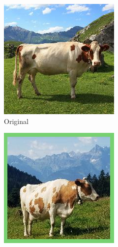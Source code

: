 \begin{figure}
    \centering
    \begin{subfigure}[b]{0.22\textwidth}
        \centering
        \includegraphics[width=\textwidth]{img/introduction/cow_original.jpg}
        \caption{Original}
    \end{subfigure}
    \hfill
    \begin{subfigure}[b]{0.22\textwidth}
        \centering
        \includegraphics[width=\textwidth]{img/introduction/cow_noise.jpg}

\end{subfigure}
\end{figure}
